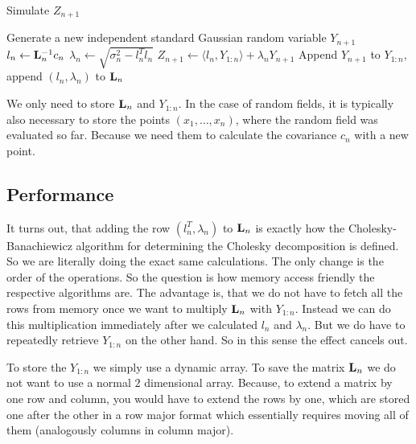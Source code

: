 \begin{algorithm}
	\caption{Simulate \(Z_{n+1}\)}\label{algo: sim Z_{n+1}}
	Generate a new independent standard Gaussian random variable \(Y_{n+1}\)\;
	\(l_n \leftarrow \mathbf{L}_n^{-1}c_n\)\; 
	\(\lambda_n \leftarrow \sqrt{\sigma_n^2- l_n^T l_n}\)\label{algo-line: sqrt}\;
	\(Z_{n+1} \leftarrow \langle l_n, Y_{1:n}\rangle + \lambda_n Y_{n+1}\)\;
	Append \(Y_{n+1}\) to \(Y_{1:n}\),
	append \((l_n, \lambda_n)\) to \(\mathbf{L}_n\)\;
\end{algorithm}
We only need to store \(\mathbf{L}_n\) and \(Y_{1:n}\). In the case of random fields,
it is typically also necessary to store the points \((x_1,\dots, x_n)\), where
the random field was evaluated so far. Because we need them to calculate the
covariance \(c_n\) with a new point.


\subsection{Performance}

It turns out, that adding the row \((l_n^T ,\lambda_n)\) to \(\mathbf{L}_n\) is exactly
how the Cholesky-Banachiewicz algorithm for determining the Cholesky
decomposition is defined. So we are literally doing the exact same calculations.
The only change is the order of the operations. So the question is how memory
access friendly the respective algorithms are. The advantage is, that we do not
have to fetch all the rows from memory once we want to multiply
\(\mathbf{L}_n\) with \(Y_{1:n}\). Instead we can do this multiplication immediately after
we calculated \(l_n\) and \(\lambda_n\). But we do have to repeatedly retrieve
\(Y_{1:n}\) on the other hand. So in this sense the effect cancels out.

To store the \(Y_{1:n}\) we simply use a dynamic array. To save the matrix \(\mathbf{L}_n\)
we do not want to use a normal \(2\) dimensional array. Because, to extend a
matrix by one row and column, you would have to extend the rows by one, which
are stored one after the other in a row major format which essentially
requires moving all of them (analogously columns in column major).


